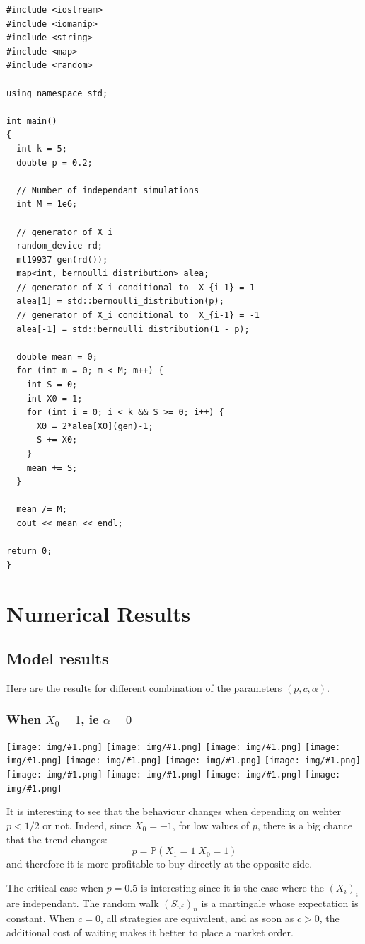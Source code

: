 \documentclass{article}
\newcommand{\IMG}[1] { \texttt{[image: img/\#1.png]} }
\newcommand{\IMGG}[1] { \texttt{[image: img/\#1.png]} }
\begin{document}
\begin{verbatim}
#include <iostream>
#include <iomanip>
#include <string>
#include <map>
#include <random>

using namespace std;

int main()
{
  int k = 5;
  double p = 0.2;

  // Number of independant simulations
  int M = 1e6;

  // generator of X_i
  random_device rd;
  mt19937 gen(rd());
  map<int, bernoulli_distribution> alea;
  // generator of X_i conditional to  X_{i-1} = 1
  alea[1] = std::bernoulli_distribution(p);
  // generator of X_i conditional to  X_{i-1} = -1
  alea[-1] = std::bernoulli_distribution(1 - p);
  
  double mean = 0;
  for (int m = 0; m < M; m++) {
    int S = 0;
    int X0 = 1;
    for (int i = 0; i < k && S >= 0; i++) {
      X0 = 2*alea[X0](gen)-1;
      S += X0;
    }
    mean += S;
  }
  
  mean /= M;
  cout << mean << endl;
  
return 0;
}
\end{verbatim}

\newpage

\section{Numerical Results}


\subsection{Model results}
Here are the results for different combination of the parameters $(p, c, \alpha)$.
\subsubsection*{When $X_0 = 1$, ie $\alpha=0$}

\begin{center}
\IMGG{legend}
\IMG{0}
\IMG{1} 
\IMG{2} 
\IMG{3} 
\IMG{4} 
\IMG{5} 
\IMG{7} 
\IMG{8} 
\IMG{9} 
\IMG{10}
\end{center}

It is interesting to see that the behaviour changes when depending on wehter $p < 1/2$ or not. Indeed, since $X_0 = -1$, for low values of $p$, there is a big chance that the trend changes:
$$ p = \mathbb P (X_1 = 1 | X_0 = 1) $$
 and therefore it is more profitable to buy directly at the opposite side.

The critical case when $p = 0.5$ is interesting since it is the case where the $(X_i)_i$ are independant. The random walk $(S_{n^k})_n$ is a martingale whose expectation is constant. When $c = 0$, all strategies are equivalent, and as soon as $c > 0$, the additional cost of waiting makes it better to place a market order.
\end{document}
